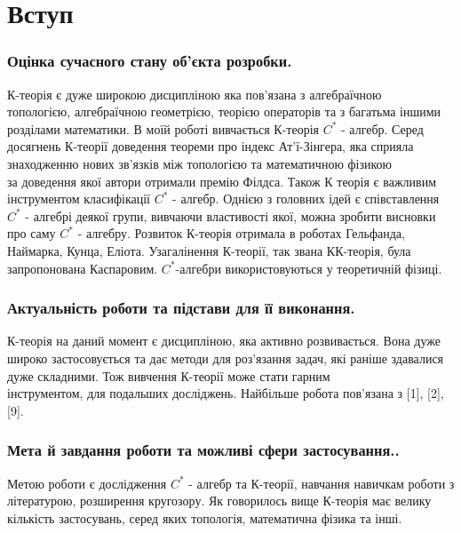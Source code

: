 \newpage
\section*{Вступ}
\label{sec:intro}
\subsubsection*{Оцінка сучасного стану об’єкта розробки.}
К-теорія є дуже широкою дисципліною яка пов'язана з алгебраїчною \\
топологією, алгебраїчною геометрією, теорією операторів та з багатьма іншими
розділами математики.
В моїй роботі вивчається К-теорія $C^*$ - алгебр.
Серед досягнень К-теорії доведення теореми про індекс Ат'ї-Зінгера, яка
сприяла \\ знаходженню нових зв'язків між топологією та математичною фізикою \\
за доведення якої автори отримали премію Філдса.
Також К теорія є важливим інструментом класифікації $C^*$ - алгебр.
Однією з головних ідей є співставлення $C^*$ - алгебрі деякої групи,
вивчаючи властивості якої, можна зробити висновки про саму $C^*$ - алгебру.
Розвиток К-теорія отримала в роботах Гельфанда, \\ Наймарка, Кунца, Еліота.
Узагалінення К-теорії, так звана КК-теорія, була запропонована
Каспаровим.
$C^*$-алгебри використовуються у теоретичній фізиці.
\subsubsection*{Актуальність роботи та підстави для її виконання.}
К-теорія на даний момент є дисципліною, яка активно розвивається.
Вона дуже широко застосовується та дає методи для роз'язання задач,
які раніше здавалися дуже складними.
Тож вивчення К-теорії може стати гарним  \\ інструментом, для подальших досліджень.
Найбільше робота пов'язана з [1], [2], [9].
\subsubsection*{Мета й завдання роботи та можливі сфери застосування..}
Метою роботи є дослідження $C^*$ - алгебр та К-теорії, навчання навичкам
роботи з літературою, розширення кругозору.
Як говорилось вище К-теорія має велику кількість застосувань,
серед яких топологія, математична фізика та інші.
